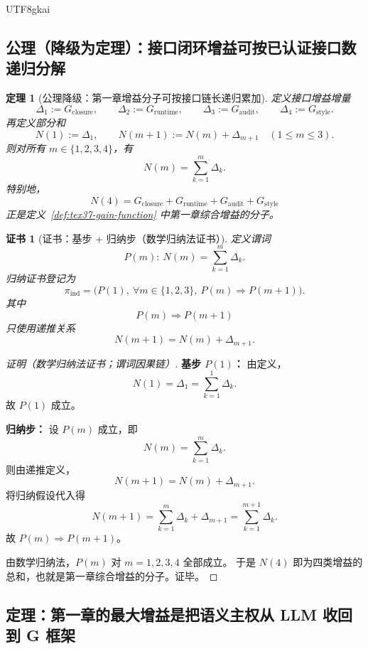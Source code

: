 \documentclass[12pt]{article}
\newtheorem{theorem}{定理}[section]
\newtheorem{Certificate}{证书}[section]
\begin{document}
\begin{CJK*}{UTF8}{gkai}
\subsection{公理（降级为定理）：接口闭环增益可按已认证接口数递归分解}
\label{subsec:tex37-gain-axiom}

\begin{theorem}[公理降级：第一章增益分子可按接口链长递归累加]
\label{thm:tex37-gain-decomposition}
定义接口增益增量
\[
  \Delta_1:=G_{\mathrm{closure}},\qquad
  \Delta_2:=G_{\mathrm{runtime}},\qquad
  \Delta_3:=G_{\mathrm{audit}},\qquad
  \Delta_4:=G_{\mathrm{style}}.
\]
再定义部分和
\[
  N(1):=\Delta_1,
  \qquad
  N(m+1):=N(m)+\Delta_{m+1}
  \quad (1\le m\le 3).
\]
则对所有 $m\in\{1,2,3,4\}$，有
\[
  N(m)=\sum_{k=1}^{m}\Delta_k.
\]
特别地，
\[
  N(4)
  =
  G_{\mathrm{closure}}
  +
  G_{\mathrm{runtime}}
  +
  G_{\mathrm{audit}}
  +
  G_{\mathrm{style}}
\]
正是定义~\ref{def:tex37-gain-function} 中第一章综合增益的分子。
\end{theorem}

\begin{Certificate}[证书：基步 + 归纳步（数学归纳法证书）]
\label{cert:tex37-gain-decomposition}
定义谓词
\[
  P(m):\ N(m)=\sum_{k=1}^{m}\Delta_k.
\]
归纳证书登记为
\[
  \pi_{\mathrm{ind}}
  =
  \bigl(P(1),\ \forall m\in\{1,2,3\},\ P(m)\Rightarrow P(m+1)\bigr).
\]
其中
\[
  P(m)\Rightarrow P(m+1)
\]
只使用递推关系
\[
  N(m+1)=N(m)+\Delta_{m+1}.
\]
\end{Certificate}

\begin{proof}[证明（数学归纳法证书；谓词因果链）]
\textbf{基步 $P(1)$：}
由定义，
\[
  N(1)=\Delta_1=\sum_{k=1}^{1}\Delta_k.
\]
故 $P(1)$ 成立。

\textbf{归纳步：}
设 $P(m)$ 成立，即
\[
  N(m)=\sum_{k=1}^{m}\Delta_k.
\]
则由递推定义，
\[
  N(m+1)=N(m)+\Delta_{m+1}.
\]
将归纳假设代入得
\[
  N(m+1)
  =
  \sum_{k=1}^{m}\Delta_k+\Delta_{m+1}
  =
  \sum_{k=1}^{m+1}\Delta_k.
\]
故 $P(m)\Rightarrow P(m+1)$。

由数学归纳法，$P(m)$ 对 $m=1,2,3,4$ 全部成立。
于是 $N(4)$ 即为四类增益的总和，也就是第一章综合增益的分子。证毕。
\end{proof}

\subsection{定理：第一章的最大增益是把语义主权从 LLM 收回到 G 框架}
\label{subsec:tex37-gain-semantic-sovereignty}


\end{CJK*}
\end{document}
